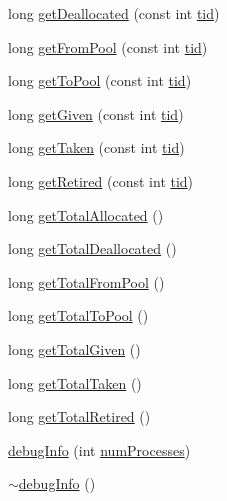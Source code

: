 \begin{DoxyCompactItemize}
\item 
long \hyperlink{classdebugInfo_ad70bb7622f68ca68aad06ca1cd830e1e}{get\+Deallocated} (const int \hyperlink{microbench_2main_8cpp_a9ca9869868fe7e7a38a921cc7de4103f}{tid})
\item 
long \hyperlink{classdebugInfo_a14b23db98a52bcfeb508f699d882db19}{get\+From\+Pool} (const int \hyperlink{microbench_2main_8cpp_a9ca9869868fe7e7a38a921cc7de4103f}{tid})
\item 
long \hyperlink{classdebugInfo_a0a2e3d57abd192ac8c8b786b40fbf4c2}{get\+To\+Pool} (const int \hyperlink{microbench_2main_8cpp_a9ca9869868fe7e7a38a921cc7de4103f}{tid})
\item 
long \hyperlink{classdebugInfo_a22c975a6619fe71f966e8a9df1be2a8d}{get\+Given} (const int \hyperlink{microbench_2main_8cpp_a9ca9869868fe7e7a38a921cc7de4103f}{tid})
\item 
long \hyperlink{classdebugInfo_a0c57a9fdca59cd9621acb2c9120ba637}{get\+Taken} (const int \hyperlink{microbench_2main_8cpp_a9ca9869868fe7e7a38a921cc7de4103f}{tid})
\item 
long \hyperlink{classdebugInfo_a141e5d59d2070dea2cd3127443f7600d}{get\+Retired} (const int \hyperlink{microbench_2main_8cpp_a9ca9869868fe7e7a38a921cc7de4103f}{tid})
\item 
long \hyperlink{classdebugInfo_a78076b2b087b74667a2fb19ba7cb2ad5}{get\+Total\+Allocated} ()
\item 
long \hyperlink{classdebugInfo_a4b3efdf4ba15d69079eda599f36d9c74}{get\+Total\+Deallocated} ()
\item 
long \hyperlink{classdebugInfo_ad4a5c3407b4bc4af44cb1b9f234222eb}{get\+Total\+From\+Pool} ()
\item 
long \hyperlink{classdebugInfo_abb0bb251d71ff691950ebacd0d29f7c3}{get\+Total\+To\+Pool} ()
\item 
long \hyperlink{classdebugInfo_ae8908c770a611a4b8745165eb47ab413}{get\+Total\+Given} ()
\item 
long \hyperlink{classdebugInfo_ad91984dff0e13832b541275397810802}{get\+Total\+Taken} ()
\item 
long \hyperlink{classdebugInfo_a430da54baa14a5ffce57ec72b2c9213e}{get\+Total\+Retired} ()
\item 
\hyperlink{classdebugInfo_a07eeaa03ce8920dff2d9f098266eef64}{debug\+Info} (int \hyperlink{testing_8cpp_aa085812188e21ede75351d88b9b2c30d}{num\+Processes})
\item 
\hyperlink{classdebugInfo_a050eab28da98e5f6565944fde958b042}{$\sim$debug\+Info} ()
\end{DoxyCompactItemize}


